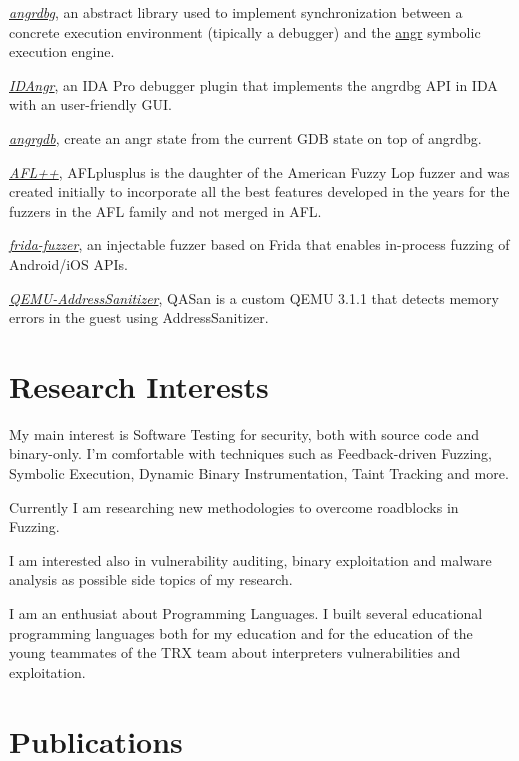 \documentclass[10pt, a4paper]{article}
\newcommand{\years}[1]{\marginnote{\scriptsize #1}}
\begin{document}
\years{2018}\href{https://github.com/andreafioraldi/angrdbg}{\emph{angrdbg}}, an abstract library used to implement synchronization between a concrete execution environment (tipically a debugger) and the \href{http://angr.io/}{angr} symbolic execution engine.

\years{2018}\href{https://andreafioraldi.github.io/IDAngr/}{\emph{IDAngr}}, an IDA Pro debugger plugin that implements the angrdbg API in IDA with an user-friendly GUI.

\years{2018}\href{https://github.com/andreafioraldi/angrgbg}{\emph{angrgdb}}, create an angr state from the current GDB state on top of angrdbg.

\years{2019}\href{https://aflplus.plus}{\emph{AFL++}}, AFLplusplus is the daughter of the American Fuzzy Lop fuzzer and was created initially to incorporate all the best features developed in the years for the fuzzers in the AFL family and not merged in AFL.

\years{2019}\href{https://github.com/andreafioraldi/frida-fuzzer}{\emph{frida-fuzzer}}, an injectable fuzzer based on Frida that enables in-process fuzzing of Android/iOS APIs.

\years{2020}\href{https://github.com/andreafioraldi/qasan}{\emph{QEMU-AddressSanitizer}}, QASan is a custom QEMU 3.1.1 that detects memory errors in the guest using AddressSanitizer.

\section*{Research Interests}

My main interest is Software Testing for security, both with source code and binary-only.
I'm comfortable with techniques such as Feedback-driven Fuzzing, Symbolic Execution, Dynamic Binary Instrumentation,
Taint Tracking and more.

Currently I am researching new methodologies to overcome roadblocks in Fuzzing.

I am interested also in vulnerability auditing, binary exploitation and malware analysis as possible side topics of my research.

I am an enthusiat about Programming Languages.
I built several educational programming languages both for my education
and for the education of the young teammates of the TRX team about interpreters vulnerabilities and exploitation.

\section*{Publications}
\end{document}
